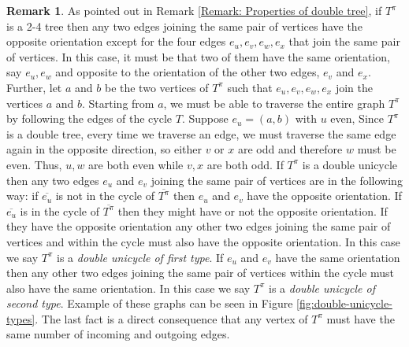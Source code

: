 \documentclass{article}
\newcommand{\paperfigurefont}{%
  \sffamily\sansmath
  \captionsetup{
    font={small,sf},
    labelfont={bf,sf}
  }%
}
\theoremstyle{definition}
\newtheorem{remark}     [theorem]{Remark}
\begin{document}
{\begin{remark}\label{Remark: Properties of double unicycle and 2-4 tree}
As pointed out in Remark \ref{Remark: Properties of double tree}, if $T^\pi$ is a 2-4 tree then any two edges joining the same pair of vertices have the opposite orientation except for the four edges $e_u,e_v,e_w,e_x$ that join the same pair of vertices. In this case, it must be that two of them have the same orientation, say $e_u,e_w$ and opposite to the orientation of the other two edges, $e_v$ and $e_x$. Further, let $a$ and $b$ be the two vertices of $T^\pi$ such that $e_u,e_v,e_w,e_x$ join the vertices $a$ and $b$. Starting from $a$, we must be able to traverse the entire graph $T^\pi$ by following the edges of the cycle $T$. Suppose $e_u=(a,b)$ with $u$ even, Since $T^\pi$ is a double tree, every time we traverse an edge, we must traverse the same edge again in the opposite direction, so either $v$ or $x$ are odd and therefore $w$ must be even. Thus, $u,w$ are both even while $v,x$ are both odd. If $T^\pi$ is a double unicycle then any two edges $e_u$ and $e_v$ joining the same pair of vertices are in the following way: if $\overline{e_u}$ is not in the cycle of $\overline{T^\pi}$ then $e_u$ and $e_v$ have the opposite orientation. If $\overline{e_u}$ is in the cycle of $\overline{T^\pi}$ then they might have or not the opposite orientation. If they have the opposite orientation any other two edges joining the same pair of vertices and within the cycle must also have the opposite orientation. In this case we say $T^\pi$ is a \textit{double unicycle of first type}. If $e_u$ and $e_v$ have the same orientation then any other two edges joining the same pair of vertices within the cycle must also have the same orientation. In this case we say $T^\pi$ is a \textit{double unicycle of second type}. Example of these graphs can be seen in Figure \ref{fig:double-unicycle-types}. The last fact is a direct consequence that any vertex of $T^\pi$ must have the same number of incoming and outgoing edges.
\end{remark}

\begin{figure}[htbp]
\centering
\paperfigurefont
\begin{minipage}{0.48\linewidth}
\centering
{}
\end{minipage}
\end{figure}}
\end{document}
